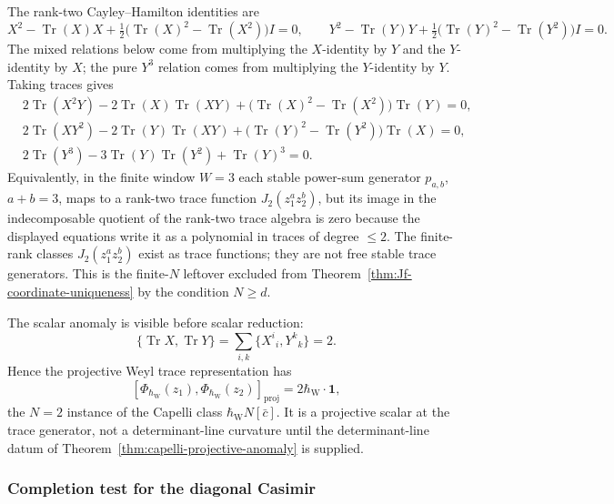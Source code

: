 \documentclass[11pt]{memoir}
\begin{document}
  The rank-two Cayley--Hamilton identities are
  \[
    X^2-\operatorname{Tr}(X)X
    +\tfrac12\bigl(\operatorname{Tr}(X)^2-\operatorname{Tr}(X^2)\bigr)I=0,
    \qquad
    Y^2-\operatorname{Tr}(Y)Y
    +\tfrac12\bigl(\operatorname{Tr}(Y)^2-\operatorname{Tr}(Y^2)\bigr)I=0.
  \]
  The mixed relations below come from multiplying the \(X\)-identity by
  \(Y\) and the \(Y\)-identity by \(X\); the pure \(Y^3\) relation comes
  from multiplying the \(Y\)-identity by \(Y\).  Taking traces gives
  \[
  \begin{aligned}
  &2\operatorname{Tr}(X^2Y)
    -2\operatorname{Tr}(X)\operatorname{Tr}(XY)
    +\bigl(\operatorname{Tr}(X)^2-\operatorname{Tr}(X^2)\bigr)
     \operatorname{Tr}(Y)=0,\\
  &2\operatorname{Tr}(XY^2)
    -2\operatorname{Tr}(Y)\operatorname{Tr}(XY)
    +\bigl(\operatorname{Tr}(Y)^2-\operatorname{Tr}(Y^2)\bigr)
     \operatorname{Tr}(X)=0,\\
  &2\operatorname{Tr}(Y^3)
    -3\operatorname{Tr}(Y)\operatorname{Tr}(Y^2)
    +\operatorname{Tr}(Y)^3=0 .
\end{aligned}
\]
Equivalently, in the finite window \(W=3\) each stable power-sum
generator \(p_{a,b}\), \(a+b=3\), maps to a rank-two trace function
\(J_2(z_1^az_2^b)\), but its image in the indecomposable quotient of
the rank-two trace algebra is zero because the displayed equations
write it as a polynomial in traces of degree \(\leq2\).  The finite-rank
classes \(J_2(z_1^az_2^b)\) exist as trace functions; they are not free
stable trace generators.  This is the finite-\(N\) leftover excluded
from Theorem~\ref{thm:Jf-coordinate-uniqueness} by the condition
\(N\geq d\).

The scalar anomaly is visible before scalar reduction:
\[
  \{\operatorname{Tr}X,\operatorname{Tr}Y\}
  =
  \sum_{i,k}\{X^i{}_i,Y^k{}_k\}
  =
  2.
\]
Hence the projective Weyl trace representation has
\[
  [\Phi_{\hbar_{\mathrm{W}}}(z_1),
   \Phi_{\hbar_{\mathrm{W}}}(z_2)]_{\mathrm{proj}}
  =
  2\hbar_{\mathrm{W}}\cdot\mathbf 1,
\]
the \(N=2\) instance of the Capelli class
\(\hbar_{\mathrm{W}}N[\bar c]\).  It is a projective scalar at the trace
generator, not a determinant-line curvature until the determinant-line
datum of Theorem~\ref{thm:capelli-projective-anomaly} is supplied.

\subsubsection{Completion test for the diagonal Casimir}
\label{sssec:ex-completion-casimir}
\end{document}
